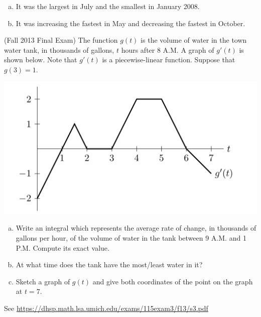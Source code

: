 \documentclass[11pt]{exam}
\begin{document}
\begin{questions}
\begin{solution}
\begin{enumerate}[(a)]
    \item It was the largest in July and the smallest in January 2008.
    \item It was increasing the fastest in May and decreasing the
      fastest in October.
    \end{enumerate}
  \end{solution}
\question (Fall 2013 Final Exam) %
The function $g(t)$ is the volume of water in the town water tank, in thousands of gallons, $t$ hours after 8 A.M. A graph of $g'(t)$ is shown below. Note that $g'(t)$ is a piecewise-linear function. Suppose that $g(3) = 1$.

\begin{minipage}{0.5\linewidth}
  \begin{center}
    \includegraphics[scale=0.4]{graphg}
  \end{center}
\end{minipage}
\begin{minipage}{0.5\linewidth}
  \begin{enumerate}[(a)]
  \item Write an integral which represents the average rate of change,
    in thousands of gallons per hour, of the volume of water in the
    tank between 9 A.M. and 1 P.M. Compute its exact value.
  \item At what time does the tank have the most/least water in it?
  \item Sketch a graph of $g(t)$ and give both coordinates of the
    point on the graph at $t = 7$.
  \end{enumerate}
\end{minipage}
\begin{solution}
  See \href{https://dhsp.math.lsa.umich.edu/exams/115exam3/f13/s3.pdf}{https://dhsp.math.lsa.umich.edu/exams/115exam3/f13/s3.pdf}
\end{solution}

\end{questions}
\end{document}
